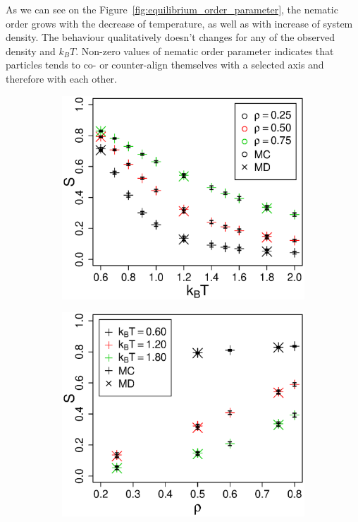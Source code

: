 \documentclass[12pt, a4paper]{article}
\newcommand{\figref}[1]{Figure~\ref{#1}}
\begin{document}
As we can see on the \figref{fig:equilibrium_order_parameter}, the nematic order grows with the decrease of temperature, as well as with increase of system density. The behaviour qualitatively doesn't changes for any of the observed density and $k_BT$. Non-zero values of nematic order parameter indicates that particles tends to co- or counter-align themselves with a selected axis and therefore with each other.

\begin{figure}
 \centering
 \begin{subfigure}{.45\textwidth}
  \centering
  \includegraphics[width=\textwidth]{Images/op_kbt_new}
 \end{subfigure}
 \begin{subfigure}{.45\textwidth}
  \centering
  \includegraphics[width=  \textwidth]{Images/op_dens}

\end{subfigure}
\end{figure}
\end{document}
